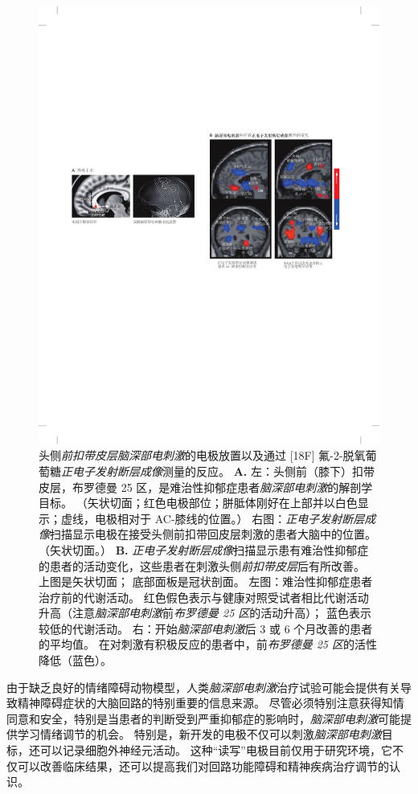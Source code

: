 \begin{figure}[htbp]
	\centering
	\includegraphics[width=0.9\linewidth]{chap61/fig_61_8}
	\caption{头侧\textit{前扣带皮层}\textit{脑深部电刺激}的电极放置以及通过 [18F] 氟-2-脱氧葡萄糖\textit{正电子发射断层成像}测量的反应。
		\textbf{A.} 左：头侧前（膝下）扣带皮层，布罗德曼 25 区，是难治性抑郁症患者\textit{脑深部电刺激}的解剖学目标。
		（矢状切面；红色电极部位；胼胝体刚好在上部并以白色显示；虚线，电极相对于 AC-膝线的位置。）
		右图：\textit{正电子发射断层成像}扫描显示电极在接受头侧前扣带回皮层刺激的患者大脑中的位置。 （矢状切面。）
		\textbf{B.} \textit{正电子发射断层成像}扫描显示患有难治性抑郁症的患者的活动变化，这些患者在刺激头侧\textit{前扣带皮层}后有所改善。
		上图是矢状切面；
		底部面板是冠状剖面。
		左图：难治性抑郁症患者治疗前的代谢活动。 红色假色表示与健康对照受试者相比代谢活动升高（注意\textit{脑深部电刺激}前\textit{布罗德曼 25 区}的活动升高）； 蓝色表示较低的代谢活动。
		右：开始\textit{脑深部电刺激}后 3 或 6 个月改善的患者的平均值。
		在对刺激有积极反应的患者中，前\textit{布罗德曼 25 区}的活性降低（蓝色）。}
	\label{fig:61_8}
\end{figure}


由于缺乏良好的情绪障碍动物模型，人类\textit{脑深部电刺激}治疗试验可能会提供有关导致精神障碍症状的大脑回路的特别重要的信息来源。
尽管必须特别注意获得知情同意和安全，特别是当患者的判断受到严重抑郁症的影响时，\textit{脑深部电刺激}可能提供学习情绪调节的机会。
特别是，新开发的电极不仅可以刺激\textit{脑深部电刺激}目标，还可以记录细胞外神经元活动。
这种“读写”电极目前仅用于研究环境，它不仅可以改善临床结果，还可以提高我们对回路功能障碍和精神疾病治疗调节的认识。



